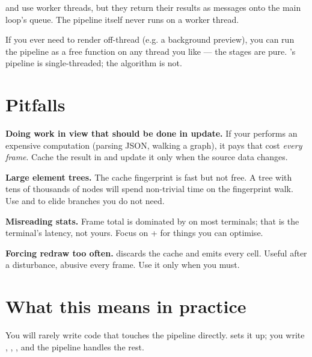  and  use worker
threads, but they return their results as messages onto the main
loop's queue. The pipeline itself never runs on a worker thread.

\begin{aside}
If you ever need to render off-thread (e.g. a background
preview), you can run the pipeline as a free function on any
thread you like --- the stages are pure. 's
pipeline is single-threaded; the algorithm is not.
\end{aside}

\section{Pitfalls}

\begin{warning}
\textbf{Doing work in view that should be done in update.} If
your  performs an expensive computation (parsing JSON,
walking a graph), it pays that cost \emph{every frame}. Cache the
result in  and update it only when the source data
changes.
\end{warning}

\begin{warning}
\textbf{Large element trees.} The cache fingerprint is fast but
not free. A tree with tens of thousands of nodes will spend
non-trivial time on the fingerprint walk. Use  and
 to elide branches you do not need.
\end{warning}

\begin{warning}
\textbf{Misreading stats.} Frame total is dominated by
 on most terminals; that is the terminal's
latency, not yours. Focus on  +
 for things you can optimise.
\end{warning}

\begin{warning}
\textbf{Forcing redraw too often.} 
discards the cache and emits every cell. Useful after a
disturbance, abusive every frame. Use it only when you must.
\end{warning}

\section{What this means in practice}

You will rarely write code that touches the pipeline directly.
 sets it up; you write , ,
,  and the pipeline handles the rest.

